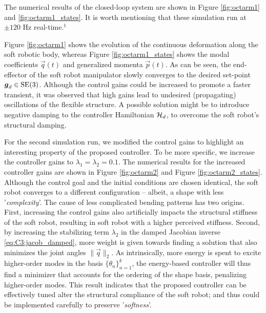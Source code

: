 %
The numerical results of the closed-loop system are shown in Figure \ref{fig:octarm1} and \ref{fig:octarm1_states}. It is worth mentioning that these simulation run at $\pm120$ \si{\hertz} real-time.$^{1}$  

Figure \ref{fig:octarm1} shows the evolution of the continuous deformation along the soft robotic body, whereas Figure \ref{fig:octarm1_states} shows the modal coefficients $\vec{q}(t)$ and generalized momenta $\vec{p}(t)$. As can be seen, the end-effector of the soft robot manipulator slowly converges to the desired set-point $\boldsymbol{g}_d \in \textup{\textrm{SE}}(3)$. Although the control gains could be increased to promote a faster transient, it was observed that high gains lead to undesired (propagating) oscillations of the flexible structure. A possible solution might be to introduce negative damping to the controller Hamiltonian $\mathcal{H}_d$, to overcome the soft robot's structural damping.

For the second simulation run, we modified the control gains to highlight an interesting property of the proposed controller. To be more specific, we increase the controller gains to $\lambda_1 = \lambda_2 = 0.1$. The numerical results for the increased controller gains are shown in Figure \ref{fig:octarm2} and Figure \ref{fig:octarm2_states}. Although the control goal and the initial conditions are chosen identical, the soft robot converges to a different configuration -- albeit, a shape with less '\textit{complexity}'. The cause of less complicated bending patterns has two origins. First, increasing the control gains also artificially impacts the structural stiffness of the soft robot, resulting in soft robot with a higher perceived stiffness. Second, by increasing the stabilizing term $\lambda_2$ in the damped Jacobian inverse \eqref{eq:C3:jacob_damped}, more weight is given towards finding a solution that also minimizes the joint angles $\lVert \vec{q} \rVert_2 $. As intrinsically, more energy is spent to excite higher-order modes in the basis $\{\theta_n\}_{n=1}^k$, the energy-based controller will thus find a minimizer that accounts for the ordering of the shape basis, penalizing higher-order modes. This result indicates that the proposed controller can be effectively tuned alter the structural compliance of the soft robot; and thus could be implemented carefully to preserve '\textit{softness}'. 

